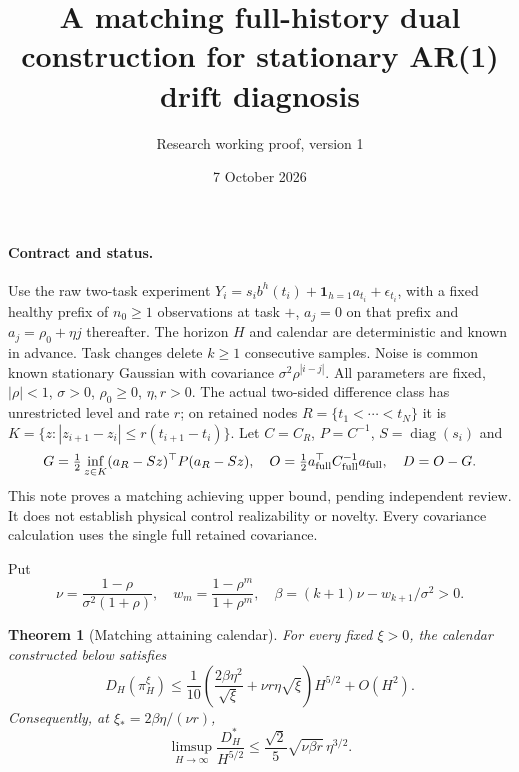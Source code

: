\documentclass[11pt]{article}
\title{A matching full-history dual construction for stationary AR(1) drift diagnosis}
\author{Research working proof, version 1}
\date{7 October 2026}
\newtheorem{theorem}{Theorem}
\newcommand{\one}{\mathbf1}
\begin{document}
\maketitle
\paragraph{Contract and status.}
Use the raw two-task experiment
$Y_i=s_i b^h(t_i)+\one_{h=1}a_{t_i}+\epsilon_{t_i}$,
with a fixed healthy prefix of $n_0\ge1$ observations at task $+$,
$a_j=0$ on that prefix and $a_j=\rho_0+\eta j$ thereafter.
The horizon $H$ and calendar are deterministic and known in advance.
Task changes delete $k\ge1$ consecutive samples. Noise is common known
stationary Gaussian with covariance $\sigma^2\rho^{|i-j|}$.
All parameters are fixed, $|\rho|<1$, $\sigma>0$, $\rho_0\ge0$, $\eta,r>0$.
The actual two-sided difference class has unrestricted level and rate $r$;
on retained nodes $R=\{t_1<\cdots<t_N\}$ it is
$K=\{z:|z_{i+1}-z_i|\le r(t_{i+1}-t_i)\}$.
Let $C=C_R$, $P=C^{-1}$, $S=\operatorname{diag}(s_i)$ and
\[
 G=\tfrac12\inf_{z\in K}(a_R-Sz)^\top P(a_R-Sz),\quad
 O=\tfrac12a_{\rm full}^\top C_{\rm full}^{-1}a_{\rm full},\quad D=O-G.
\]
This note proves a matching achieving upper bound, pending independent
review. It does not establish physical control realizability or novelty.
Every covariance calculation uses the single full retained covariance.

Put
\begin{equation}\label{eq:coeff}
 \nu=\frac{1-\rho}{\sigma^2(1+\rho)},\quad
 w_m=\frac{1-\rho^m}{1+\rho^m},\quad
 \beta=(k+1)\nu-w_{k+1}/\sigma^2>0.
\end{equation}

\begin{theorem}[Matching attaining calendar]\label{thm:upper}
For every fixed $\xi>0$, the calendar constructed below satisfies
\begin{equation}\label{eq:main}
 D_H(\pi_H^\xi)\le
 \frac1{10}\left(\frac{2\beta\eta^2}{\sqrt\xi}
 +\nu r\eta\sqrt\xi\right)H^{5/2}+O(H^2).
\end{equation}
Consequently, at $\xi_*=2\beta\eta/(\nu r)$,
\begin{equation}\label{eq:optimized}
 \limsup_{H\to\infty}\frac{D_H^*}{H^{5/2}}
 \le\frac{\sqrt2}{5}\sqrt{\nu\beta r}\,\eta^{3/2}.
\end{equation}
\end{theorem}
\end{document}
